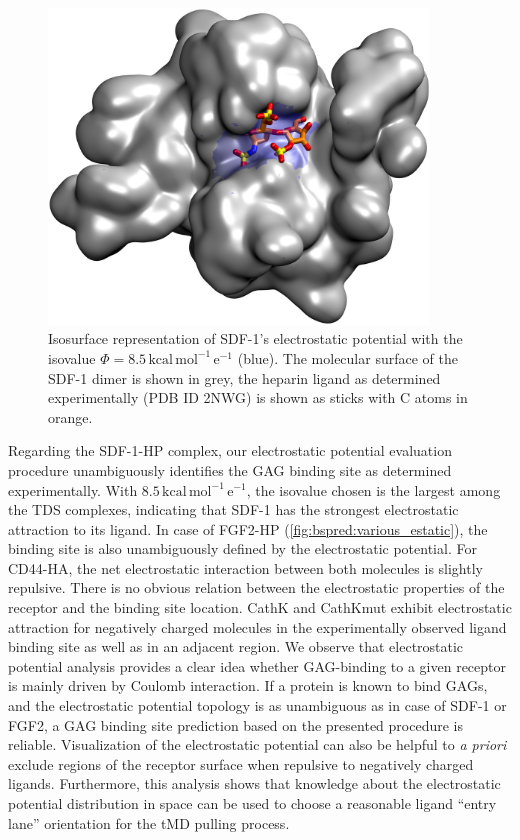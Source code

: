 \begin{figure}
\centering
\includegraphics[width=0.9\textwidth]{gfx/bspred/sdf1_isopot_8_5_view1_rotated_jcc_pub_001.jpg}
\caption[]{
Isosurface representation of SDF-1's electrostatic potential with the isovalue
$\Phi = 8.5\,\mathrm{kcal\,mol^{-1}\,e^{-1}}$ (blue). The molecular surface of
the SDF-1 dimer is shown in grey, the heparin ligand as determined
experimentally (PDB ID 2NWG) is shown as sticks with C atoms in orange.
}
\label{fig:bspred:sdf1_estatic}
\end{figure}

Regarding the SDF-1-HP complex, our electrostatic potential evaluation procedure
unambiguously identifies the GAG binding site as determined experimentally. With
$8.5\,\mathrm{kcal\,mol^{-1}\,e^{-1}}$, the isovalue chosen is the largest among
the TDS complexes, indicating that SDF-1 has the strongest electrostatic
attraction to its ligand. In case of FGF2-HP (\cref{fig:bspred:various_estatic}), the
binding site is also unambiguously defined by the electrostatic potential. For
CD44-HA, the net electrostatic interaction between both molecules is slightly
repulsive. There is no obvious relation between the electrostatic properties of
the receptor and the binding site location. CathK and CathKmut exhibit
electrostatic attraction for negatively charged molecules in the experimentally
observed ligand binding site as well as in an adjacent region. We observe that
electrostatic potential analysis provides a clear idea whether GAG-binding to a
given receptor is mainly driven by Coulomb interaction. If a protein is known to
bind GAGs, and the electrostatic potential topology is as unambiguous as in case
of SDF-1 or FGF2, a GAG binding site prediction based on the presented procedure
is reliable. Visualization of the electrostatic potential can also be helpful to
\textit{a priori} exclude regions of the receptor surface when repulsive to
negatively charged ligands. Furthermore, this analysis shows that knowledge
about the electrostatic potential distribution in space can be used to choose a
reasonable ligand \enquote{entry lane} orientation for the tMD pulling process.


